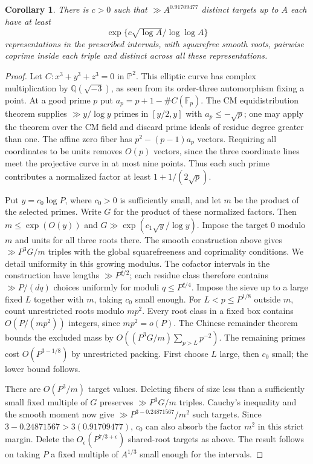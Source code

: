 \documentclass[11pt,letterpaper]{article}
\newtheorem{corollary}[corollary]{Corollary}
\theoremstyle{definition}
\begin{document}
\begin{corollary}\label{c3:growing-fibres}
There is $c>0$ such that $\gg A^{0.91709477}$ distinct targets up to $A$
each have at least
\[
                   \exp\{c\sqrt{\log A}/\log\log A\}
\]
representations in the prescribed intervals, with squarefree smooth
roots, pairwise coprime inside each triple and distinct across all
these representations.
\end{corollary}
\begin{proof}
Let $C:x^3+y^3+z^3=0$ in $\mathbb P^2$. This elliptic curve has
complex multiplication by $\mathbb Q(\sqrt{-3})$, as seen from
its order-three automorphism fixing a point. At a good prime $p$
put $a_p=p+1-\#C(\mathbb F_p)$. The CM equidistribution theorem
\cite[Corollary~3.8]{c3:fitesutherland} supplies $\gg y/\log y$
primes in $[y/2,y]$ with $a_p\le-\sqrt p$; one may apply the
theorem over the CM field and discard prime ideals of residue degree
greater than one. The affine zero fiber has $p^2-(p-1)a_p$ vectors.
Requiring all coordinates to be units removes $O(p)$ vectors,
since the three coordinate lines meet the projective curve in at
most nine points. Thus each such prime contributes a normalized
factor at least $1+1/(2\sqrt p)$.

Put $y=c_0\log P$, where $c_0>0$ is sufficiently small, and let
$m$ be the product of the selected primes. Write $G$ for the
product of these normalized factors. Then $m\le\exp(O(y))$ and
$G\gg\exp(c_1\sqrt y/\log y)$. Impose the target $0$ modulo $m$
and units for all three roots there. The smooth construction above
gives $\gg P^3G/m$ triples with the global squarefreeness and
coprimality conditions. We detail uniformity in this growing
modulus. The cofactor intervals in the construction have lengths
$\gg P^{\xi/2}$; each residue class therefore contains $\gg P/(dq)$
choices uniformly for moduli $q\le P^{\xi/4}$.
Impose the sieve up to a large fixed $L$ together with $m$, taking
$c_0$ small enough. For $L<p\le P^{1/8}$ outside $m$, count
unrestricted roots modulo $mp^2$. Every root class in a fixed
box contains $O(P/(mp^2))$ integers, since $mp^2=o(P)$.
The Chinese remainder theorem bounds the excluded mass by
$O((P^3G/m)\sum_{p>L}p^{-2})$. The remaining primes cost
$O(P^{3-1/8})$ by unrestricted packing. First choose $L$ large,
then $c_0$ small; the lower bound follows.

There are $O(P^3/m)$ target values. Deleting fibers of size
less than a sufficiently small fixed multiple of $G$ preserves
$\gg P^3G/m$ triples. Cauchy's inequality and the smooth moment
now give $\gg P^{3-0.24871567}/m^2$ such targets.
Since $3-0.24871567>3(0.91709477)$, $c_0$ can also absorb
the factor $m^2$ in this strict margin. Delete the
$O_\epsilon(P^{7/3+\epsilon})$ shared-root targets as above.
The result follows on taking $P$ a fixed multiple of $A^{1/3}$
small enough for the intervals.
\end{proof}
\end{document}
